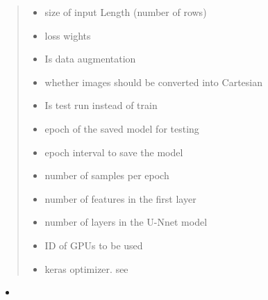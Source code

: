 \documentclass[letterpaper,10pt,english]{sphinxmanual}
\begin{document}
\begin{fulllineitems}
\begin{quote}
\begin{description}
\begin{itemize}
\item {} 
 \textendash{} size of input Length (number of rows)

\item {} 
 \textendash{} loss wights

\item {} 
 \textendash{} Is data augmentation

\item {} 
 \textendash{} whether images should be converted into Cartesian

\item {} 
 \textendash{} Is test run instead of train

\item {} 
 \textendash{} epoch of the saved model for testing

\item {} 
 \textendash{} epoch interval to save the model

\item {} 
 \textendash{} number of samples per epoch

\item {} 
 \textendash{} number of features in the first layer

\item {} 
 \textendash{} number of layers in the U-Nnet model

\item {} 
 \textendash{} ID of GPUs to be used

\item {} 
 \textendash{} keras optimizer. see 

\end{itemize}

\end{description}\end{quote}



\begin{itemize}
\item {} 
{\hyperref[\detokenize{index:boundary.boundary.boundary_model}]{}}


\end{itemize}
\end{fulllineitems}
\end{document}

